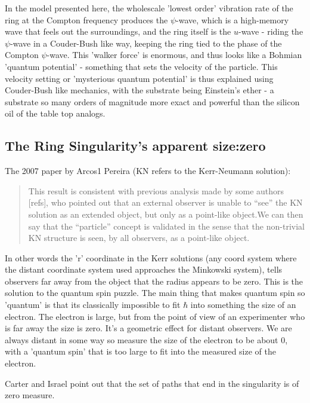 \documentclass[../rzero]{subfiles}
\begin{document}
In the model presented here, the wholescale 'lowest order' vibration rate of the ring at the Compton frequency produces the $\psi$-wave, which is a high-memory wave that feels out the surroundings, and the ring itself is the $u$-wave - riding the $\psi$-wave in a Couder-Bush\cite{Bush2015}\cite{Turton2018} like way, keeping the ring tied to the phase of the Compton $\psi$-wave. This 'walker force' is enormous, and thus looks like a Bohmian 'quantum potential' - something that sets the velocity of the particle. This velocity setting or 'mysterious quantum potential' is thus explained using Couder-Bush like mechanics, with the substrate being Einstein's ether - a substrate so many orders of magnitude more exact and powerful than the silicon oil of the table top analogs. 

\subsection{The Ring Singularity's apparent size:zero}
The 2007 paper by Arcos1 Pereira (KN refers to the Kerr-Neumann solution): \cite{Arcos2007} 

\begin{quotation}
This result is consistent with previous analysis made by some authors [refs],
who pointed out that an external observer is unable to “see” the KN solution
as an extended object, but only as a point-like object.We can then say that the
“particle” concept is validated in the sense that the non-trivial KN structure
is seen, by all observers, as a point-like object. 
\end{quotation}

In other words the 'r' coordinate in the Kerr solutions (any coord system where the distant coordinate system used approaches the Minkowski system), tells observers far away from the object that the radius appears to be zero. This is the solution to the quantum spin puzzle. The main thing that makes quantum spin so 'quantum' is that its classically impossible to fit $\hbar$ into something the size of an electron. The electron is large, but from the point of view of an experimenter who is far away the size is zero. It's a geometric effect for distant observers. We are always distant in some way so measure the size of the electron to be about 0, with a 'quantum spin' that is too large to fit into the measured size of the electron. 

Carter and Israel point out that the set of paths that end in the singularity is of zero measure.
\end{document}
